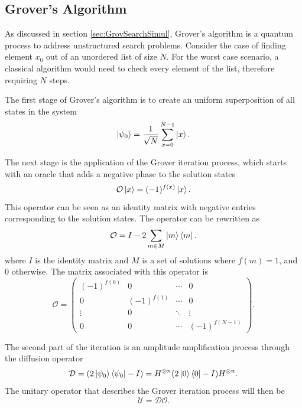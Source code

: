 \documentclass[../../dissertation.tex]{subfiles}
\begin{document}
\subsection{Grover's Algorithm}
As discussed in section \ref{sec:GrovSearchSimul}, Grover's algorithm is a
quantum process to address unstructured search problems. Consider the case of
finding element $x_0$ out of an unordered list of size $N$. For the worst case
scenario, a classical algorithm would need to check every element of the list,
therefore requiring $N$ steps.\par

The first stage of Grover's algorithm is to create an uniform superposition of
all states in the system
\begin{equation}
	\ket{\psi_0}  = \frac{1}{\sqrt{N}}\sum_{x=0}^{N-1} \ket{x}.
\end{equation}\par

The next stage is the application of the Grover iteration process, which starts
with an oracle that adds a negative phase to the solution states
\begin{equation}
        \mathcal{O}\ket{x} = (-1)^{f(x)}\ket{x}.
\end{equation}
This operator can be seen as an identity matrix with negative entries
corresponding to the solution states. The operator can be rewritten as 
\begin{equation}
	\mathcal{O} = I - 2\sum_{m\in M} \ket{m}\bra{m}.
	\label{eq:groverQiskitOracle}
\end{equation}
where $I$ is the identity matrix and $M$ is a set of solutions where $f(m) =
1$, and $0$ otherwise. The matrix associated with this operator is
\begin{equation}
	\mathcal{O} = 
	\begin{pmatrix}
		(-1)^{f(0)} & 0 & \cdots & 0\\
	        0 & (-1)^{f(1)} & \cdots & 0\\ 
	        \vdots & 0 &  \ddots & \vdots\\ 
		0 & 0 & \cdots &  (-1)^{f(N-1)}
	\end{pmatrix}.
	\label{eq:oracleMatrixQiskit}
\end{equation}\par

The second part of the iteration is an amplitude amplification process through the diffusion operator 
\begin{equation}
        \mathcal{D} = (2\ket{\psi_0}\bra{\psi_0} - I) = H^{\otimes n}(2\ket{0}\bra{0} - I)H^{\otimes n}.
	\label{eq:groverQiskitDiffusion}
\end{equation}
The unitary operator that describes the Grover iteration process will then be
\begin{equation}
        \mathcal{U} = \mathcal{D}\mathcal{O}.
\end{equation}\par
\end{document}
